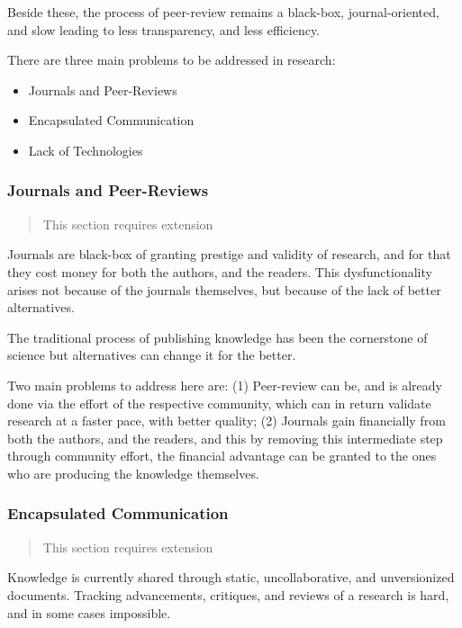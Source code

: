 Beside these, the process of peer-review remains a black-box, journal-oriented, and slow leading to less transparency, and less efficiency.

There are three main problems to be addressed in research:
\begin{itemize}
    \item Journals and Peer-Reviews
    \item Encapsulated Communication
    \item Lack of Technologies
\end{itemize}

\subsubsection{Journals and Peer-Reviews}\label{subsubsec:journals-and-peer-reviews}
\begin{quotation}
    This section requires extension
\end{quotation}
Journals are black-box of granting prestige and validity of research, and for that they cost money for both the authors, and the readers.
This dysfunctionality arises not because of the journals themselves, but because of the lack of better alternatives.

The traditional process of publishing knowledge has been the cornerstone of science but alternatives can change it for the better.

Two main problems to address here are: (1) Peer-review can be, and is already done via the effort of the respective community, which can in return validate research at a faster pace, with better quality;
(2) Journals gain financially from both the authors, and the readers, and this by removing this intermediate step through community effort, the financial advantage can be granted to the ones who are producing the knowledge themselves.

\subsubsection{Encapsulated Communication}\label{subsubsec:encapsulated-communication}
\begin{quotation}
    This section requires extension
\end{quotation}

Knowledge is currently shared through static, uncollaborative, and unversionized documents.
Tracking advancements, critiques, and reviews of a research is hard, and in some cases impossible.

